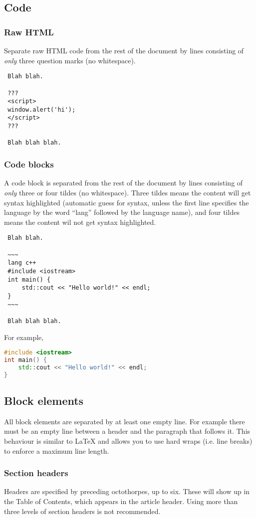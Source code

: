 \subsection{Code}
\label{s2.2}
\subsubsection{Raw HTML}
\label{s2.2.1}
Separate raw HTML code from the rest of the document by lines consisting of \emph{only} three question marks (no whitespace).

\begin{lstlisting}
 Blah blah.

 ???
 <script>
 window.alert('hi');
 </script>
 ???

 Blah blah blah.
\end{lstlisting}
\subsubsection{Code blocks}
\label{s2.2.2}
A code block is separated from the rest of the document by lines consisting of \emph{only} three or four tildes (no whitespace). Three tildes means the content will get syntax highlighted (automatic guess for syntax, unless the first line specifies the language by the word ``lang'' followed by the language name), and four tildes means the content wil not get syntax highlighted.

\begin{lstlisting}
 Blah blah.

 ~~~
 lang c++
 #include <iostream>
 int main() {
     std::cout << "Hello world!" << endl;
 }
 ~~~

 Blah blah blah.
\end{lstlisting}
For example,

\begin{lstlisting}[language=c++]
#include <iostream>
int main() {
    std::cout << "Hello world!" << endl;
}
\end{lstlisting}
\subsection{Block elements}
\label{s2.3}
All block elements are separated by at least one empty line. For example there must be an empty line between a header and the paragraph that follows it. This behaviour is similar to LaTeX and allows you to use hard wraps (i.e. line breaks) to enforce a maximum line length.

\subsubsection{Section headers}
\label{s2.3.1}
Headers are specified by preceding octothorpes, up to six. These will show up in the Table of Contents, which appears in the article header. Using more than three levels of section headers is not recommended.

